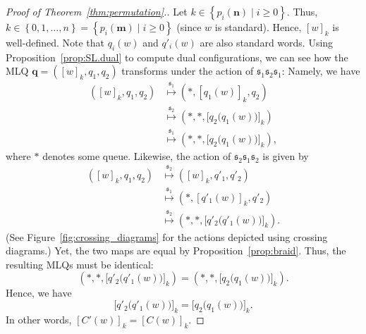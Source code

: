 \documentclass[reqno]{amsart}
\newcommand{\0}{\phantom{c}}
\newcommand{\mm}{\mathbf{m}}
\newcommand{\nn}{\mathbf{n}}
\newcommand{\qq}{\mathbf{q}}
\newcommand{\fraks}{\mathfrak{s}}
\newcommand{\set}[1]{\left\{ #1 \right\}}
\newcommand{\tup}[1]{\left( #1 \right)}
\theoremstyle{plain}
\theoremstyle{definition}
\numberwithin{equation}{section}
\begin{document}
\begin{proof}[Proof of Theorem~\ref{thm:permutation}.]
Let $k \in \set{ p_i(\nn) \mid i \geq 0}$.
Thus, $k \in \set{0, 1, \ldots, n} = \set{ p_i(\mm) \mid i \geq 0 }$ (since $w$ is standard).
Hence, $[w]_k$ is well-defined.
Note that $q_i(w)$ and $q'_i(w)$ are also standard words.
Using Proposition~\ref{prop:SL.dual} to compute dual
configurations, we can see how the MLQ
$\qq = \tup{[w]_k, q_1, q_2}$ transforms under the action of
$\fraks_1 \fraks_2 \fraks_1$: Namely, we have
\begin{align*}
\tup{[w]_k, q_1, q_2} & \overset{\fraks_1}{\longmapsto} \tup{\ast, [q_1(w)]_k, q_2}
\\ & \overset{\fraks_2}{\longmapsto} \tup{\ast, \ast, \bigl[ q_2\bigl( q_1(w) \bigr) \bigr]_k}
\\ & \overset{\fraks_1}{\longmapsto} \tup{\ast, \ast, \bigl[ q_2\bigl( q_1(w) \bigr) \bigr]_k},
\end{align*}
where $\ast$ denotes some queue.
Likewise, the action of $\fraks_2 \fraks_1 \fraks_2$ is given by
\begin{align*}
\tup{[w]_k, q_1, q_2} & \overset{\fraks_2}{\longmapsto} \tup{[w]_k, q'_1, q'_2}
\\ & \overset{\fraks_1}{\longmapsto} \tup{\ast, [q'_1(w)]_k , q'_2}
\\ & \overset{\fraks_2}{\longmapsto} \tup{\ast, \ast, \bigl[ q'_2\bigl( q'_1(w) \bigr) \bigr]_k}.
\end{align*}
(See Figure~\ref{fig:crossing_diagrams} for the actions depicted using crossing diagrams.)
Yet, the two maps are equal by Proposition~\ref{prop:braid}.
Thus, the resulting MLQs must be identical:
\[
\tup{\ast, \ast, \bigl[ q'_2\bigl(q'_1(w) \bigr) \bigr]_k}
=
\tup{\ast, \ast, \bigl[ q_2\bigl(q_1(w) \bigr) \bigr]_k}.
\]
Hence, we have
\[
\bigl[ q'_2\bigl( q'_1(w) \bigr) \bigr]_k = \bigl[ q_2\bigl( q_1(w) \bigr) \bigr]_k.
\]
In other words, $[C'(w)]_k = [C(w)]_k$.
\end{proof}
\end{document}
